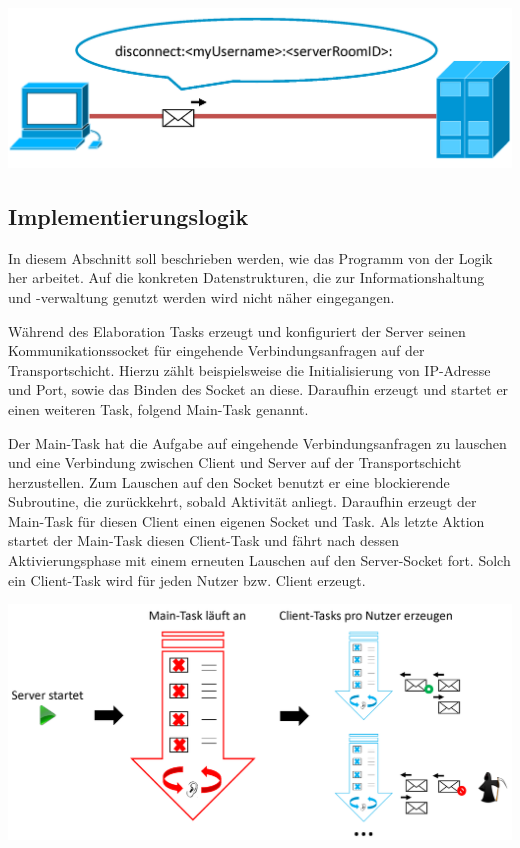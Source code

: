 \documentclass[12pt,a4paper,bibliography=totocnumbered,listof=totocnumbered]{scrartcl}
\begin{document}
\vspace{1em}
\begin{minipage}{\linewidth}
	\centering
	\includegraphics[width=0.7\linewidth]{img/disconnect.png}
	\label{fig:disconnect}
\end{minipage}


\subsection{Implementierungslogik}
In diesem Abschnitt soll beschrieben werden, wie das Programm von der Logik her arbeitet. Auf die konkreten Datenstrukturen, die zur Informationshaltung und -verwaltung genutzt werden wird nicht näher eingegangen. 

Während des Elaboration Tasks erzeugt und konfiguriert der Server seinen Kommunikationssocket für eingehende Verbindungsanfragen auf der Transportschicht. Hierzu zählt beispielsweise die Initialisierung von IP-Adresse und Port, sowie das Binden des Socket an diese. Daraufhin erzeugt und startet er einen weiteren Task, folgend Main-Task genannt. 

Der Main-Task hat die Aufgabe auf eingehende Verbindungsanfragen zu lauschen und eine Verbindung zwischen Client und Server auf der Transportschicht herzustellen. Zum Lauschen auf den Socket benutzt er eine blockierende Subroutine, die zurückkehrt, sobald Aktivität anliegt. Daraufhin erzeugt der Main-Task für diesen Client einen eigenen Socket und Task. Als letzte Aktion startet der Main-Task diesen Client-Task und fährt nach dessen Aktivierungsphase mit einem erneuten Lauschen auf den Server-Socket fort. Solch ein Client-Task wird für jeden Nutzer bzw. Client erzeugt. 

\vspace{1em}
\begin{minipage}{\linewidth}
	\centering
	\includegraphics[width=1\linewidth]{img/Implementierungslogik.png}
	\label{fig:Implementierungslogik}
\end{minipage}
\vspace{0.5em}
\end{document}
